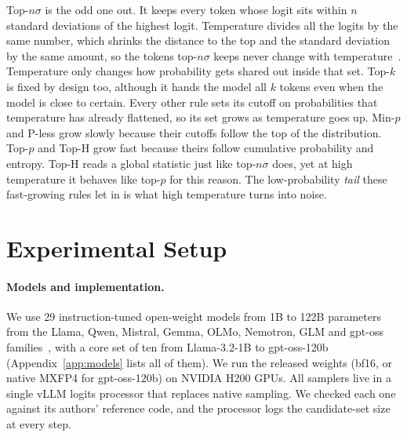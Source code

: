 \documentclass{article}
\begin{document}
Top-$n\sigma$ is the odd one out. It keeps every token whose logit sits within $n$ standard deviations of the highest logit. Temperature divides all the logits by the same number, which shrinks the distance to the top and the standard deviation by the same amount, so the tokens top-$n\sigma$ keeps never change with temperature~\citep{tang2024topnsigma}. Temperature only changes how probability gets shared out inside that set. Top-$k$ is fixed by design too, although it hands the model all $k$ tokens even when the model is close to certain. Every other rule sets its cutoff on probabilities that temperature has already flattened, so its set grows as temperature goes up. Min-$p$ and P-less grow slowly because their cutoffs follow the top of the distribution. Top-$p$ and Top-H grow fast because theirs follow cumulative probability and entropy. Top-H reads a global statistic just like top-$n\sigma$ does, yet at high temperature it behaves like top-$p$ for this reason. The low-probability \emph{tail} these fast-growing rules let in is what high temperature turns into noise.

\section{Experimental Setup}
\label{sec:setup}

\paragraph{Models and implementation.}
We use 29 instruction-tuned open-weight models from 1B to 122B parameters from the Llama, Qwen, Mistral, Gemma, OLMo, Nemotron, GLM and gpt-oss families~\citep{dubey2024llama3,yang2024qwen2,jiang2023mistral,openai2025gptoss,xu2025ultralong}, with a core set of ten from Llama-3.2-1B to gpt-oss-120b (Appendix~\ref{app:models} lists all of them). We run the released weights (bf16, or native MXFP4 for gpt-oss-120b) on NVIDIA H200 GPUs. All samplers live in a single vLLM logits processor that replaces native sampling. We checked each one against its authors' reference code, and the processor logs the candidate-set size at every step.
\end{document}
